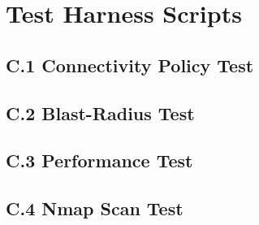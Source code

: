 \chapter{Test Harness Scripts}
\label{ch:appendix-tests}

\section*{C.1 \quad Connectivity Policy Test}


\section*{C.2 \quad Blast-Radius Test}


\section*{C.3 \quad Performance Test}


\section*{C.4 \quad Nmap Scan Test}


